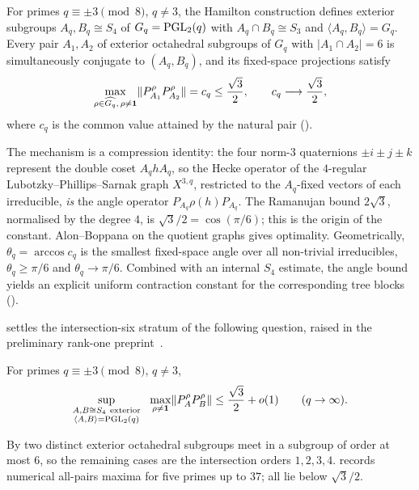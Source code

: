 \begin{lettertheorem}
\label{ithm:F}
For primes $q\equiv\pm3\pmod8$, $q\ne3$, the Hamilton construction
defines exterior subgroups $A_q,B_q\cong S_4$ of $G_q=\operatorname{PGL}_2(q)$ with
$A_q\cap B_q\cong S_3$ and $\langle A_q,B_q\rangle=G_q$. Every pair
$A_1,A_2$ of exterior octahedral subgroups of $G_q$ with $|A_1\cap A_2|=6$
is simultaneously conjugate to $(A_q,B_q)$, and its fixed-space
projections satisfy
\[
 \max_{\rho\in\widehat{G_q},\,\rho\ne\mathbf1}
              \lVert P_{A_1}^\rho P_{A_2}^\rho \rVert=c_q\le\frac{\sqrt3}{2},
 \qquad c_q\longrightarrow\frac{\sqrt3}{2},
\]
where $c_q$ is the common value attained by the natural pair
\textup{()}.
\end{lettertheorem}

The mechanism is a compression identity: the four norm-$3$ quaternions
$\pm i\pm j\pm k$ represent the double coset $A_qhA_q$, so the Hecke
operator of the $4$-regular Lubotzky--Phillips--Sarnak graph $X^{3,q}$,
restricted to the $A_q$-fixed vectors of each irreducible, \emph{is} the
angle operator $P_{A_q}\rho(h)P_{A_q}$. The Ramanujan bound $2\sqrt3$,
normalised by the degree $4$, is $\sqrt3/2=\cos(\pi/6)$; this is the
origin of the constant. Alon--Boppana on the quotient graphs gives
optimality. Geometrically, $\theta_q=\arccos c_q$ is the smallest
fixed-space angle over all non-trivial irreducibles, $\theta_q\ge\pi/6$
and $\theta_q\to\pi/6$. Combined with an internal $S_4$ estimate, the
angle bound yields an explicit uniform contraction constant for the
corresponding tree blocks ().

 settles the intersection-six stratum of the following
question, raised in the preliminary rank-one
preprint~\cite[Conjecture 6.9]{ZermenoRankOneZenodo}.

\begin{conjecture}
\label{conj:allpairs}
For primes $q\equiv\pm3\pmod8$, $q\ne3$,
\[
 \sup_{\substack{A,B\cong S_4\ \mathrm{exterior}\\
                 \langle A,B\rangle=\PGL_2(q)}}\ \
 \max_{\rho\ne\mathbf1}\opn{P_A^\rho P_B^\rho}
 \le\frac{\sqrt3}{2}+o(1)\qquad(q\to\infty).
\]
\end{conjecture}

By  two distinct exterior octahedral subgroups
meet in a subgroup of order at most $6$, so the remaining cases are the
intersection orders $1,2,3,4$. \Cref{tab:allpairs-evidence} records numerical
all-pairs maxima for five primes up to $37$; all lie below $\sqrt3/2$.

